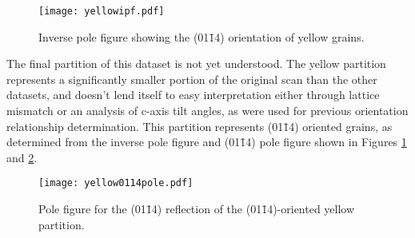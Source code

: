 \begin{figure}
\centering
\texttt{[image: yellowipf.pdf]}
\caption[Inverse pole figure showing orientation of  yellow grains]{%
Inverse pole figure showing the (01\={1}4) orientation of yellow grains.}
\label{fig:yellowipf}

\end{figure}
The final partition of this dataset is not yet understood. The yellow partition represents
a significantly smaller portion of the original scan than the other datasets, and doesn't
lend itself to easy interpretation either through lattice mismatch or an analysis of
c-axis tilt angles, as were used for previous orientation relationship determination. This
partition represents (01\={1}4) oriented grains, as determined from the inverse pole
figure and (01\={1}4) pole figure shown in Figures \ref{fig:yellowipf} and
\ref{fig:yellow0114pole}.

\begin{figure}
\begin{center}
\texttt{[image: yellow0114pole.pdf]}
\caption[(01\={1}4) pole figure for yellow grains]{%
	Pole figure for the (01\={1}4) reflection of the (01\={1}4)-oriented yellow
partition.}
\label{fig:yellow0114pole}
\end{center}
\end{figure}
			

